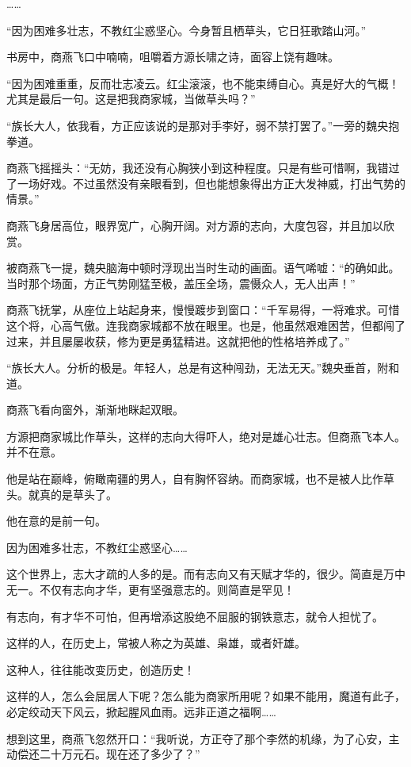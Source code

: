 \begin{this_body}
……

“因为困难多壮志，不教红尘惑坚心。今身暂且栖草头，它日狂歌踏山河。”

书房中，商燕飞口中喃喃，咀嚼着方源长啸之诗，面容上饶有趣味。

“因为困难重重，反而壮志凌云。红尘滚滚，也不能束缚自心。真是好大的气概！尤其是最后一句。这是把我商家城，当做草头吗？”

“族长大人，依我看，方正应该说的是那对手李好，弱不禁打罢了。”一旁的魏央抱拳道。

商燕飞摇摇头：“无妨，我还没有心胸狭小到这种程度。只是有些可惜啊，我错过了一场好戏。不过虽然没有亲眼看到，但也能想象得出方正大发神威，打出气势的情景。”

商燕飞身居高位，眼界宽广，心胸开阔。对方源的志向，大度包容，并且加以欣赏。

被商燕飞一提，魏央脑海中顿时浮现出当时生动的画面。语气唏嘘：“的确如此。当时那个场面，方正气势刚猛至极，盖压全场，震慑众人，无人出声！”

商燕飞抚掌，从座位上站起身来，慢慢踱步到窗口：“千军易得，一将难求。可惜这个将，心高气傲。连我商家城都不放在眼里。也是，他虽然艰难困苦，但都闯了过来，并且屡屡收获，修为更是勇猛精进。这就把他的性格培养成了。”

“族长大人。分析的极是。年轻人，总是有这种闯劲，无法无天。”魏央垂首，附和道。

商燕飞看向窗外，渐渐地眯起双眼。

方源把商家城比作草头，这样的志向大得吓人，绝对是雄心壮志。但商燕飞本人。并不在意。

他是站在巅峰，俯瞰南疆的男人，自有胸怀容纳。而商家城，也不是被人比作草头。就真的是草头了。

他在意的是前一句。

因为困难多壮志，不教红尘惑坚心……

这个世界上，志大才疏的人多的是。而有志向又有天赋才华的，很少。简直是万中无一。不仅有志向才华，更有坚强意志的。则简直是罕见！

有志向，有才华不可怕，但再增添这股绝不屈服的钢铁意志，就令人担忧了。

这样的人，在历史上，常被人称之为英雄、枭雄，或者奸雄。

这种人，往往能改变历史，创造历史！

这样的人，怎么会屈居人下呢？怎么能为商家所用呢？如果不能用，魔道有此子，必定绞动天下风云，掀起腥风血雨。远非正道之福啊……

想到这里，商燕飞忽然开口：“我听说，方正夺了那个李然的机缘，为了心安，主动偿还二十万元石。现在还了多少了？”


\end{this_body}
